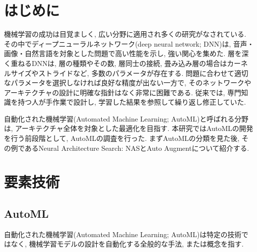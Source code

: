 \documentclass[twocolumn]{jarticle}     %
\begin{document}




\section{はじめに}

機械学習の成功は目覚ましく, 広い分野に適用され多くの研究がなされている.
その中でディープニューラルネットワーク(deep neural network; DNN)は, 音声・画像・自然言語を対象とした問題で高い性能を示し, 強い関心を集めた.
層を深く重ねるDNNは, 層の種類やその数, 層同士の接続, 畳み込み層の場合はカーネルサイズやストライドなど, 多数のパラメータが存在する.
問題に合わせて適切なパラメータを選択しなければ良好な精度が出ない一方で, そのネットワークやアーキテクチャの設計に明確な指針はなく非常に困難である. 従来では, 専門知識を持つ人が手作業で設計し, 学習した結果を参照して繰り返し修正していた.


自動化された機械学習(Automated Machine Learning; AutoML)と呼ばれる分野は, アーキテクチャ全体を対象とした最適化を目指す.
本研究ではAutoMLの開発を行う前段階として, AutoMLの調査を行った. まずAutoMLの分類を見た後, その例であるNeural Architecture Search: NASとAuto Augmentについて紹介する.

\section{要素技術}
\subsection{AutoML}
自動化された機械学習(Automated Machine Learning; AutoML)は特定の技術ではなく, 機械学習モデルの設計を自動化する全般的な手法, または概念を指す.
\end{document}

